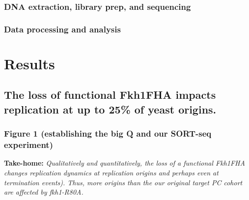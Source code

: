 \documentclass[
]{article}
\begin{document}
\hypertarget{dna-extraction-library-prep-and-sequencing-1}{%
\subsubsection{DNA extraction, library prep, and sequencing}\label{dna-extraction-library-prep-and-sequencing-1}}

\hypertarget{data-processing-and-analysis-1}{%
\subsubsection{Data processing and analysis}\label{data-processing-and-analysis-1}}

\hypertarget{results}{%
\section{Results}\label{results}}

\hypertarget{the-loss-of-functional-fkh1fha-impacts-replication-at-up-to-25-of-yeast-origins.}{%
\subsection{The loss of functional Fkh1FHA impacts replication at up to 25\% of yeast origins.}\label{the-loss-of-functional-fkh1fha-impacts-replication-at-up-to-25-of-yeast-origins.}}

\hypertarget{figure-1-establishing-the-big-q-and-our-sort-seq-experiment}{%
\subsubsection{Figure 1 (establishing the big Q and our SORT-seq experiment)}\label{figure-1-establishing-the-big-q-and-our-sort-seq-experiment}}

\textbf{Take-home:} \emph{Qualitatively and quantitatively, the loss of a functional Fkh1FHA changes replication dynamics at replication origins and perhaps even at termination events). Thus, more origins than the our original target PC cohort are affected by fkh1-R80A.}
\end{document}
